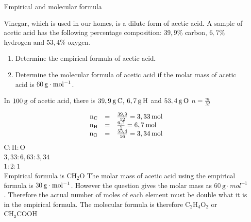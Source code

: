       \begin{wex}{Empirical and molecular formula
      }
 {
     \label{m38712*probfhsst!!!underscore!!!id1310}
      \label{m38712*id281533}Vinegar, which is used in our homes, is a dilute form of acetic acid. A sample of acetic acid has the following percentage composition: $39,9\%$ carbon, $6,7\%$ hydrogen and $53,4\%$ oxygen.  
      \label{m38712*id281540}\begin{enumerate}[noitemsep, label=\textbf{\arabic*}. ] 
            \leftskip=20pt\rightskip=\leftskip\label{m38712*uid71}\item Determine the empirical formula of acetic acid.
\label{m38712*uid72}\item Determine the molecular formula of acetic acid if the molar mass of acetic acid is $60\phantom{\rule{2pt}{0ex}}\text{g}\ensuremath{\cdot}\text{mol}{}^{-1}$.
\end{enumerate}
     }
{
      \label{m38712*id281607}In $100\phantom{\rule{2pt}{0ex}}\text{g}$ of acetic acid, there is $39,9\phantom{\rule{2pt}{0ex}}\text{g}\phantom{\rule{2pt}{0ex}}\text{C}$, $6,7\phantom{\rule{2pt}{0ex}}\text{g}\phantom{\rule{2pt}{0ex}}\text{H}$ and $53,4\phantom{\rule{2pt}{0ex}}\text{g}\phantom{\rule{2pt}{0ex}}\text{O}$ 
      \label{m38712*id281633}
        $n=\frac{m}{M}$
      
      \label{m38712*id281653}\nopagebreak\noindent{}
        
    \begin{equation*}
    \begin{array}{ccc}\hfill {\text{n}}_{\text{C}}& =& \frac{39,9}{12}=3,33\phantom{\rule{2pt}{0ex}}\text{mol}\hfill \\ \hfill {\text{n}}_{\text{H}}& =& \frac{6,7}{1}=6,7\phantom{\rule{2pt}{0ex}}\text{mol}\hfill \\ \hfill {\text{n}}_{\text{O}}& =& \frac{53,4}{16}=3,34\phantom{\rule{2pt}{0ex}}\text{mol}\hfill \end{array}
      \end{equation*}
      \label{m38712*id281812}
$\text{C}:\text{H}:\text{O}$\\
$3,33:6,63:3,34$ \\
$1:2:1$\\
Empirical formula is $\text{CH}{}_{2}\text{O}$ 
      \label{m38712*id281834}The molar mass of acetic acid using the empirical formula is $30\phantom{\rule{2pt}{0ex}}\text{g}\ensuremath{\cdot}\text{mol}{}^{-1}$. However the question gives the molar mass as $60~\text{g}\cdot{mol}^{-1}$. Therefore the actual number of moles of each element must be double what it is in the empirical formula.
      \label{m38712*id281854}The molecular formula is therefore $\text{C}{}_{2}\text{H}{}_{4}\text{O}{}_{2}$ or $\text{CH}{}_{3}\text{COOH}$
}
    \end{wex}
